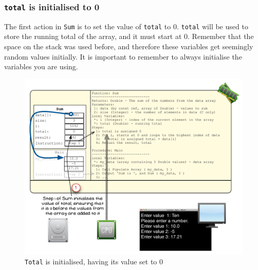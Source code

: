 \clearpage
\subsubsection{\texttt{total} is initialised to 0} %
\label{ssub:total_is_initialised_to_0}

The first action in \texttt{Sum} is to set the value of \texttt{total} to 0. \texttt{total} will be used to store the running total of the array, and it must start at 0. Remember that the space on the stack was used before, and therefore these variables get seemingly random values initially. It is important to remember to always initialise the variables you are using.

\begin{figure}[htbp]
   \centering
   \includegraphics[width=\textwidth]{./topics/arrays/images/Sum2} 
   \caption{\texttt{Total} is initialised, having its value set to 0}
   \label{fig:sum-array-vis-2}
\end{figure}


